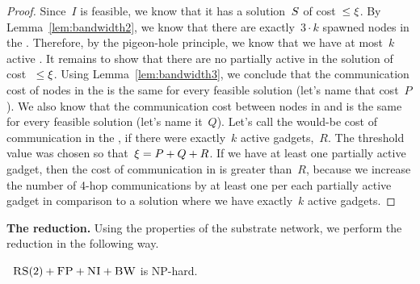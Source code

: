 \begin{proof}
  Since~$I$ is feasible, we know that it has a solution~$S$ of
  cost~$\leq \xi$.
  By Lemma~\ref{lem:bandwidth2}, we know that there are
  exactly~$3\cdot k$ spawned nodes in the {\MatchSubtree}. Therefore, by
  the pigeon-hole principle, we know that we have at most~$k$
  active {\TripleGadgets}. It remains to show that there
  are no partially active {\TripleGadgets} in the solution of cost
 ~$\leq \xi$.
  Using Lemma~\ref{lem:bandwidth3}, 
  we conclude that the communication cost of
  nodes in the {\CoverSubtree} is the same for every feasible solution
  (let's name that cost~$P$). We also know that the communication cost
  between nodes in {\CoverSubtree} and {\MatchSubtree} is the same for
  every feasible solution (let's name it~$Q$). Let's call the
  would-be cost of communication in the {\MatchSubtree}, if there were
  exactly~$k$ active gadgets,~$R$.
  The threshold value was chosen so that~$\xi = P+Q+R$. If we have at least one partially active
  gadget, then the cost of communication in {\MatchSubtree} is greater
  than~$R$, because we increase the number of 4-hop communications by
  at least one per each partially active gadget in comparison to a solution
  where we have exactly~$k$ active gadgets.
\end{proof}

\noindent \textbf{The reduction.}
Using the properties of the substrate network, we perform the reduction in the following way.

\begin{theorem}
 ~$\textsc{RS}(2)+\textsc{FP}+\textsc{NI}+\textsc{BW}$ is NP-hard.
\end{theorem}

